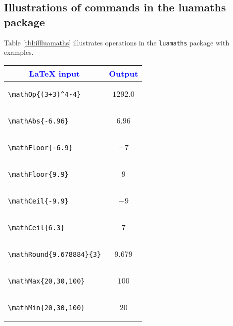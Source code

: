 \documentclass{article}
\begin{document}
\subsection{Illustrations of commands in the luamaths package}
Table \ref{tbl:illluamaths} illustrates operations in the \verb|luamaths| package with examples.
\begin{center}
\begin{longtable}{lc}
\toprule
\multicolumn{1}{c}{\textcolor{blue}{LaTeX input}} &\multicolumn{1}{c}{\textcolor{blue}{Output}}  \\
\toprule
\begin{lstlisting}
\mathOp{(3+3)^4-4}
\end{lstlisting} & \(1292.0\)\\
\midrule
\begin{lstlisting}
\mathAbs{-6.96}
\end{lstlisting} & \(6.96\)\\
\midrule


\begin{lstlisting}
\mathFloor{-6.9}
\end{lstlisting} & \(-7\) \\
\midrule

\begin{lstlisting}
\mathFloor{9.9}
\end{lstlisting} & \(9\)\\
\midrule


\begin{lstlisting}
\mathCeil{-9.9}
\end{lstlisting} &  \(-9\) \\
\midrule

\begin{lstlisting}
\mathCeil{6.3}
\end{lstlisting} &\(7\)\\
\midrule

\begin{lstlisting}
\mathRound{9.678884}{3}
\end{lstlisting} & \(9.679\)\\
\midrule

\begin{lstlisting}
\mathMax{20,30,100}
\end{lstlisting} &\(100\) \\
\midrule

\begin{lstlisting}
\mathMin{20,30,100}
\end{lstlisting} &\(20\)\\
\midrule



\end{longtable}
\end{center}
\end{document}

